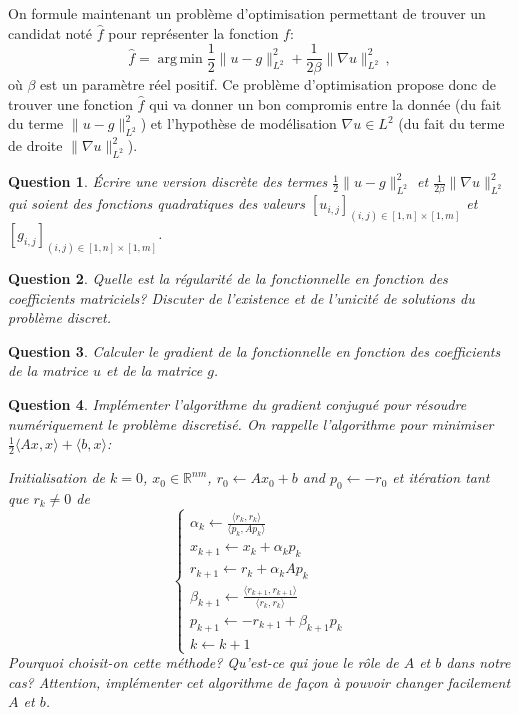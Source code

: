 \documentclass[10pt,a4paper,fleqn]{report}
\DeclareMathOperator*{\argmin}{arg\,min}
\newcommand{\dotp}[2]{\langle #1 , #2\rangle}
\newcommand{\R}{\mathbb R}
\newtheorem{question}{Question}
\begin{document}
 On formule maintenant un probl\`eme d'optimisation permettant de trouver un candidat not\'e $\hat{f}$ pour repr\'esenter la fonction $f$:
\begin{equation}
\hat{f} = \argmin \frac12 \| u -  g\|_{L^2}^2 + \frac{1}{2\beta}\| \nabla u \|^2_{L^2}\,,
\end{equation}
o\`u $\beta$ est un param\`etre r\'eel positif.
Ce probl\`eme d'optimisation propose donc de trouver une fonction $\hat{f}$ qui va donner un bon compromis entre la donn\'ee (du fait du terme $ \| u -  g\|_{L^2}^2 $) et l'hypoth\`ese de mod\'elisation $\nabla u \in L^2$ (du fait du terme de droite $\| \nabla u \|^2_{L^2}$).

\begin{question}
\'Ecrire une version discr\`ete des termes $\frac12 \| u -  g\|_{L^2}^2$ et $\frac{1}{2\beta}\| \nabla u \|^2_{L^2}$ qui soient des fonctions quadratiques des valeurs $[u_{i,j}]_{(i,j)\in [1,n]\times[1,m]}$ et $[g_{i,j}]_{(i,j)\in [1,n]\times[1,m]}$.
\end{question}

\begin{question}
Quelle est la r\'egularit\'e de la fonctionnelle en fonction des coefficients matriciels?
Discuter de l'existence et de l'unicit\'e de solutions du probl\`eme discret.
\end{question}

\begin{question}
Calculer le gradient de la fonctionnelle en fonction des coefficients de la matrice $u$ et de la matrice $g$.
\end{question}

\begin{question}
Impl\'ementer l'algorithme du gradient conjugu\'e pour r\'esoudre num\'eriquement le probl\`eme discretis\'e. On rappelle l'algorithme pour minimiser $\frac12 \dotp{Ax}{x}+\dotp{b}{x}$:

Initialisation de $k=0$,
$x_0 \in \R^{nm}$,  $r_0 \leftarrow Ax_0 + b$ and $p_0 \leftarrow -r_0$ et it\'eration tant que $r_k\neq 0$ de
\begin{equation}
\begin{cases}
    \alpha_k \leftarrow \frac{\dotp{r_k}{r_k} }{ \dotp{p_k}{A p_k} } \\
    x_{k+1} \leftarrow x_k + \alpha_k p_k         \\
    r_{k+1} \leftarrow r_k + \alpha_k A p_k       \\
    \beta_{k+1} \leftarrow \frac{ \dotp{r_{k+1}}{r_{k+1}} }{ \dotp{r_k}{r_k} }   \\
    p_{k+1} \leftarrow -r_{k+1} + \beta_{k+1} p_k\\
    k \leftarrow k+1
\end{cases}
\end{equation}
Pourquoi choisit-on cette m\'ethode? Qu'est-ce qui joue le r\^ole de $A$ et $b$ dans notre cas?
Attention, impl\'ementer cet algorithme de fa\c{c}on \`a pouvoir changer facilement $A$ et $b$.
\end{question}
\end{document}

